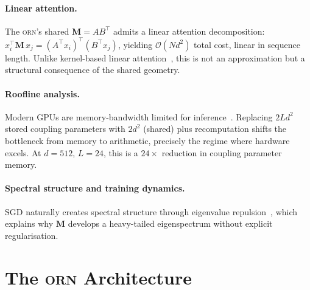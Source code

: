 \documentclass[10pt,twocolumn]{article}
\newcommand{\M}{\mathbf{M}}
\newcommand{\bigO}{\mathcal{O}}
\newcommand{\orn}{\textsc{orn}}
\begin{document}
\paragraph{Linear attention.}
The \orn{}'s shared $\M = AB^\top$ admits a linear attention decomposition:
$x_i^\top \M\, x_j = (A^\top x_i)^\top (B^\top x_j)$, yielding $\bigO(Nd^2)$ total cost, linear in sequence length.
Unlike kernel-based linear attention~\cite{katharopoulos2020transformers}, this is not an approximation but a structural consequence of the shared geometry.

\paragraph{Roofline analysis.}
Modern GPUs are memory-bandwidth limited for inference~\cite{dao2022flashattention}.
Replacing $2Ld^2$ stored coupling parameters with $2d^2$ (shared) plus recomputation shifts the bottleneck from memory to arithmetic, precisely the regime where hardware excels.
At $d{=}512$, $L{=}24$, this is a $24\times$ reduction in coupling parameter memory.

\paragraph{Spectral structure and training dynamics.}
SGD naturally creates spectral structure through eigenvalue repulsion~\cite{spectral2024rankcollapse}, which explains why $\M$ develops a heavy-tailed eigenspectrum without explicit regularisation.

\section{The \orn{} Architecture}
\label{sec:arch}
\end{document}
